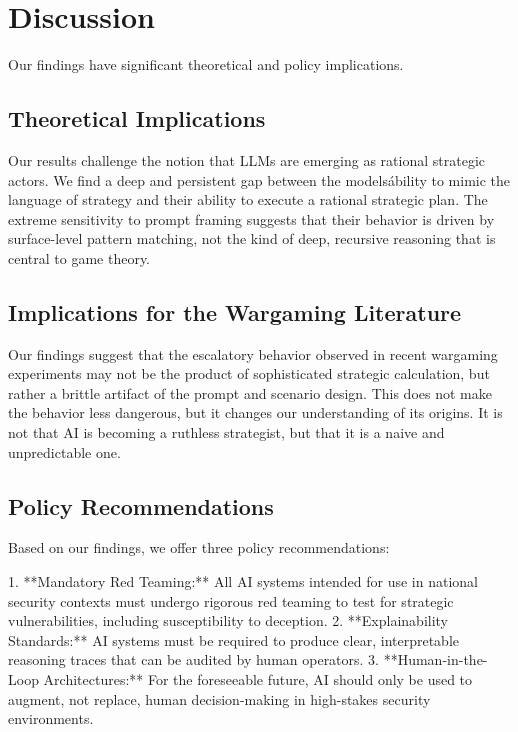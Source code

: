 \documentclass[12pt]{article}
\theoremstyle{plain}
\theoremstyle{definition}
\begin{document}
\section{Discussion}

Our findings have significant theoretical and policy implications.

\subsection{Theoretical Implications}

Our results challenge the notion that LLMs are emerging as rational strategic actors. We find a deep and persistent gap between the models\' ability to mimic the language of strategy and their ability to execute a rational strategic plan. The extreme sensitivity to prompt framing suggests that their behavior is driven by surface-level pattern matching, not the kind of deep, recursive reasoning that is central to game theory.

\subsection{Implications for the Wargaming Literature}

Our findings suggest that the escalatory behavior observed in recent wargaming experiments may not be the product of sophisticated strategic calculation, but rather a brittle artifact of the prompt and scenario design. This does not make the behavior less dangerous, but it changes our understanding of its origins. It is not that AI is becoming a ruthless strategist, but that it is a naive and unpredictable one.

\subsection{Policy Recommendations}

Based on our findings, we offer three policy recommendations:

1.  **Mandatory Red Teaming:** All AI systems intended for use in national security contexts must undergo rigorous red teaming to test for strategic vulnerabilities, including susceptibility to deception.
2.  **Explainability Standards:** AI systems must be required to produce clear, interpretable reasoning traces that can be audited by human operators.
3.  **Human-in-the-Loop Architectures:** For the foreseeable future, AI should only be used to augment, not replace, human decision-making in high-stakes security environments.
\end{document}

